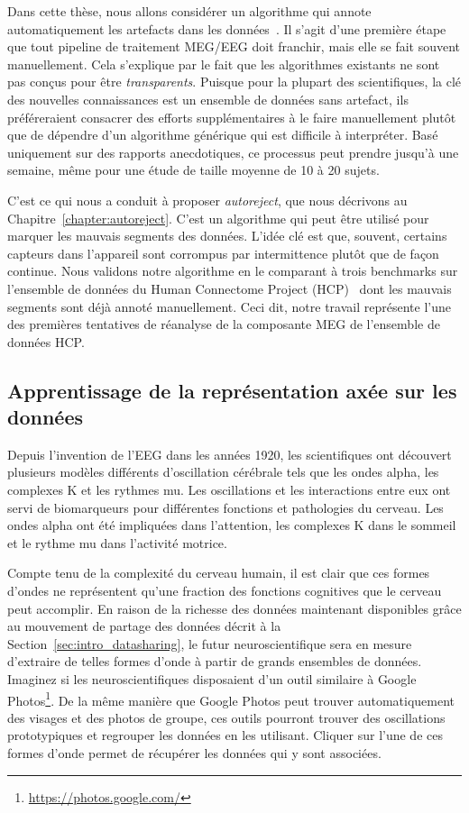Dans cette thèse, nous allons considérer un algorithme qui annote automatiquement les artefacts dans les données~\citep{jas2016automated, jas2017autoreject}. Il s'agit d'une première étape que tout pipeline de traitement MEG/EEG doit franchir, mais elle se fait souvent manuellement. Cela s'explique par le fait que les algorithmes existants ne sont pas conçus pour être \emph{transparents}. Puisque pour la plupart des scientifiques, la clé des nouvelles connaissances est un ensemble de données sans artefact, ils préféreraient consacrer des efforts supplémentaires à le faire manuellement plutôt que de dépendre d'un algorithme générique qui est difficile à interpréter. Basé uniquement sur des rapports anecdotiques, ce processus peut prendre jusqu'à une semaine, même pour une étude de taille moyenne de 10 à 20 sujets.

C'est ce qui nous a conduit à proposer \emph{autoreject}, que nous décrivons au Chapitre~\ref{chapter:autoreject}. C'est un algorithme qui peut être utilisé pour marquer les mauvais segments des données. L'idée clé est que, souvent, certains capteurs dans l'appareil sont corrompus par intermittence plutôt que de façon continue. Nous validons notre algorithme en le comparant à trois benchmarks sur l'ensemble de données du Human Connectome Project (HCP)~\citep{larson2013adding} dont les mauvais segments sont déjà annoté manuellement. Ceci dit, notre travail représente l'une des premières tentatives de réanalyse de la composante MEG de l'ensemble de données HCP.

\subsection*{Apprentissage de la représentation axée sur les données}
\label{sec:sommaire:representation_learning}
Depuis l'invention de l'EEG dans les années 1920, les scientifiques ont découvert plusieurs modèles différents d'oscillation cérébrale tels que les ondes alpha, les complexes K et les rythmes mu. Les oscillations et les interactions entre eux ont servi de biomarqueurs pour différentes fonctions et pathologies du cerveau. Les ondes alpha ont été impliquées dans l'attention, les complexes K dans le sommeil et le rythme mu dans l'activité motrice.

Compte tenu de la complexité du cerveau humain, il est clair que ces formes d'ondes ne représentent qu'une fraction des fonctions cognitives que le cerveau peut accomplir. En raison de la richesse des données maintenant disponibles grâce au mouvement de partage des données décrit à la Section~\ref{sec:intro_datasharing}, le futur neuroscientifique sera en mesure d'extraire de telles formes d'onde à partir de grands ensembles de données. Imaginez si les neuroscientifiques disposaient d'un outil similaire à Google Photos\footnote{\url{https://photos.google.com/}}. De la même manière que Google Photos peut trouver automatiquement des visages et des photos de groupe, ces outils pourront trouver des oscillations prototypiques et regrouper les données en les utilisant. Cliquer sur l'une de ces formes d'onde permet de récupérer les données qui y sont associées.

